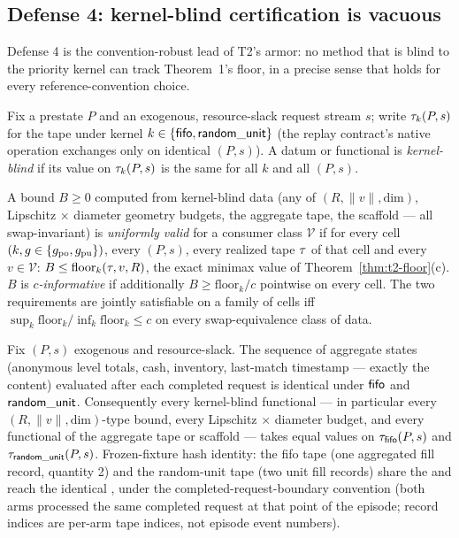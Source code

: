 \subsection{Defense 4: kernel-blind certification is vacuous}
\label{sec:t2-defense4}

Defense 4 is the convention-robust lead of T2's armor: no method that is
blind to the priority kernel can track Theorem~1's floor, in a precise sense
that holds for every reference-convention choice.

\begin{definition}
\label{def:kernelblind}
Fix a prestate $P$ and an exogenous, resource-slack request stream $s$; write
$\tau_k(P,s)$ for the tape under kernel
$k \in \{\mathsf{fifo}, \mathsf{random\_unit}\}$ (the replay contract's native operation exchanges
only  on identical $(P,s)$). A datum or functional is
\emph{kernel-blind} if its value on $\tau_k(P,s)$ is the same for all $k$
and all $(P,s)$.
\end{definition}

\begin{definition}
\label{def:validbound}
A bound $B \ge 0$ computed from kernel-blind data (any of $(R, \|v\|,
\mathrm{dim})$, Lipschitz $\times$ diameter geometry budgets, the aggregate
tape, the scaffold --- all swap-invariant) is \emph{uniformly valid} for a
consumer class $\mathcal{V}$ if for every cell $(k, g \in \{g_{\mathrm{po}},
g_{\mathrm{pu}}\})$, every $(P,s)$, every realized tape $\tau$ of that cell and every
$v \in \mathcal{V}$: $B \le \mathrm{floor}_k(\tau, v, R)$, the exact
minimax value of Theorem~\ref{thm:t2-floor}(c). $B$ is
\emph{$c$-informative} if additionally $B \ge \mathrm{floor}_k / c$
pointwise on every cell. The two requirements are jointly satisfiable on a
family of cells iff $\sup_k \mathrm{floor}_k / \inf_k \mathrm{floor}_k \le c$
on every swap-equivalence class of data.
\end{definition}

\begin{lemma}
\label{lem:g2-1}
Fix $(P,s)$ exogenous and resource-slack. The sequence of aggregate states
(anonymous level totals, cash, inventory, last-match timestamp --- exactly
the  content) evaluated after each completed
request is identical under $\mathsf{fifo}$ and $\mathsf{random\_unit}$. Consequently every
kernel-blind functional --- in particular every $(R,\|v\|,\mathrm{dim})$-type
bound, every Lipschitz $\times$ diameter budget, and every functional of the
aggregate tape or scaffold --- takes equal values on $\tau_{\mathsf{fifo}}(P,s)$
and $\tau_{\mathsf{random\_unit}}(P,s)$. Frozen-fixture hash identity: the fifo tape
 (one aggregated fill record, quantity 2) and the
random-unit tape  (two unit fill records) share the
 \preagghash{} and reach the identical
 \postagghash{}, under the
completed-request-boundary convention (both arms processed the same
completed request at that point of the episode; record indices are per-arm
tape indices, not episode event numbers).
\end{lemma}

